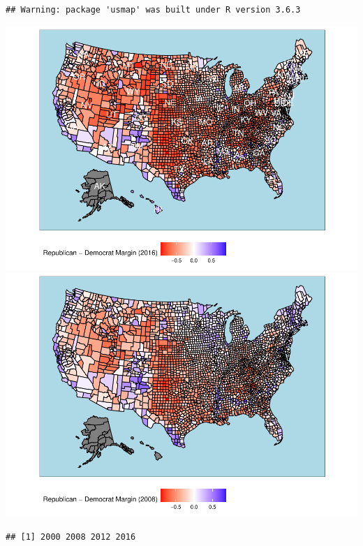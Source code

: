 \documentclass[
  english,
  man]{apa6}
\begin{document}
\begin{verbatim}
## Warning: package 'usmap' was built under R version 3.6.3
\end{verbatim}

\includegraphics{Script_files/figure-latex/visualization part 2-1.pdf} \includegraphics{Script_files/figure-latex/visualization part 2-2.pdf}

\begin{verbatim}
## [1] 2000 2008 2012 2016
\end{verbatim}
\end{document}
